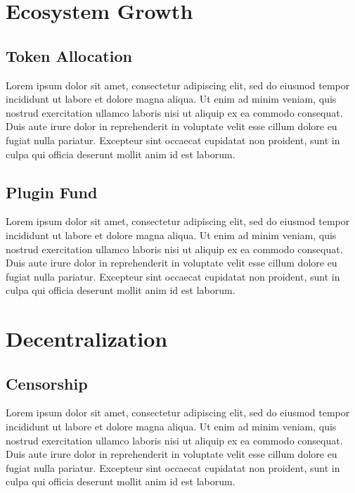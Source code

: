 \documentclass{article}
\newcommand\tab[1][1cm]{\hspace*{#1}}
\begin{document}

\section{Ecosystem Growth}
\subsection{Token Allocation}

\tab Lorem ipsum dolor sit amet, consectetur adipiscing elit, sed do eiusmod tempor incididunt ut labore et dolore magna aliqua. Ut enim ad minim veniam, quis nostrud exercitation ullamco laboris nisi ut aliquip ex ea commodo consequat. Duis aute irure dolor in reprehenderit in voluptate velit esse cillum dolore eu fugiat nulla pariatur. Excepteur sint occaecat cupidatat non proident, sunt in culpa qui officia deserunt mollit anim id est laborum.

\subsection{Plugin Fund}

\tab Lorem ipsum dolor sit amet, consectetur adipiscing elit, sed do eiusmod tempor incididunt ut labore et dolore magna aliqua. Ut enim ad minim veniam, quis nostrud exercitation ullamco laboris nisi ut aliquip ex ea commodo consequat. Duis aute irure dolor in reprehenderit in voluptate velit esse cillum dolore eu fugiat nulla pariatur. Excepteur sint occaecat cupidatat non proident, sunt in culpa qui officia deserunt mollit anim id est laborum.


\section{Decentralization}
\subsection{Censorship}

\tab Lorem ipsum dolor sit amet, consectetur adipiscing elit, sed do eiusmod tempor incididunt ut labore et dolore magna aliqua. Ut enim ad minim veniam, quis nostrud exercitation ullamco laboris nisi ut aliquip ex ea commodo consequat. Duis aute irure dolor in reprehenderit in voluptate velit esse cillum dolore eu fugiat nulla pariatur. Excepteur sint occaecat cupidatat non proident, sunt in culpa qui officia deserunt mollit anim id est laborum.
\end{document}
